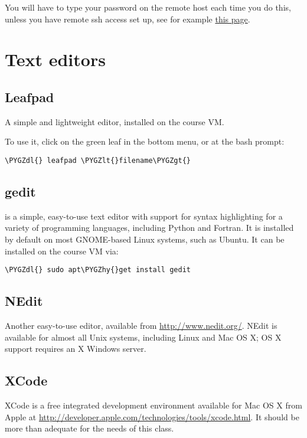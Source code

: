 \documentclass[letterpaper,10pt,english]{sphinxmanual}
\def\PYGZlt{\char`\<}
\def\PYGZgt{\char`\>}
\def\PYGZdl{\char`\$}
\def\PYGZhy{\char`\-}
\begin{document}
You will have to type your password on the remote host each
time you do this, unless you have remote ssh access set up, see for example
\href{http://www.debian.org/devel/passwordlessssh}{this page}.


\section{Text editors}
\label{editors:text-editors}\label{editors::doc}\label{editors:editors}

\subsection{Leafpad}
\label{editors:leafpad}
A simple and lightweight editor, installed on the course VM.

To use it, click on the green leaf in the bottom menu, or at the bash
prompt:

\begin{Verbatim}[commandchars=\\\{\}]
\PYGZdl{} leafpad \PYGZlt{}filename\PYGZgt{}
\end{Verbatim}


\subsection{gedit}
\label{editors:gedit}
 is a simple, easy-to-use text editor with support for syntax
highlighting for a variety of programming languages, including Python
and Fortran.  It is installed by default on most GNOME-based Linux
systems, such as Ubuntu.  It can be installed on the course VM via:

\begin{Verbatim}[commandchars=\\\{\}]
\PYGZdl{} sudo apt\PYGZhy{}get install gedit
\end{Verbatim}


\subsection{NEdit}
\label{editors:nedit}
Another easy-to-use editor, available from \url{http://www.nedit.org/}.
NEdit is available for almost all Unix systems, including Linux and
Mac OS X; OS X support requires an X Windows server.


\subsection{XCode}
\label{editors:xcode}
XCode is a free integrated development environment available for Mac
OS X from Apple at
\url{http://developer.apple.com/technologies/tools/xcode.html}.  It
should be more than adequate for the needs of this class.
\end{document}
